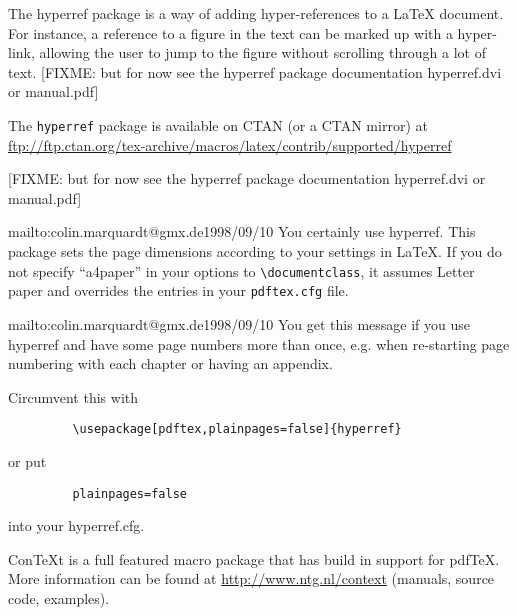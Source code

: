 \documentclass[11pt]{article}
\begin{document}
{ 

  The hyperref package is a way of adding hyper-references to a LaTeX
  document.  For instance, a reference to a figure in the text can be
  marked up with a hyper-link, allowing the user to jump to the figure
  without scrolling through a lot of text.  [FIXME: but for now see
  the hyperref package documentation hyperref.dvi or manual.pdf] }

The \texttt{hyperref} package is available on CTAN (or a CTAN mirror)
at
\url{ftp://ftp.ctan.org/tex-archive/macros/latex/contrib/supported/hyperref}



{ [FIXME: but for now
  see the hyperref package documentation hyperref.dvi or manual.pdf] }



{  {mailto:colin.marquardt@gmx.de}{1998/09/10}
  You certainly use hyperref. This package sets the page dimensions
  according to your settings in LaTeX. If you do not specify
  ``a4paper'' in your options to \verb+\documentclass+, it assumes
  Letter paper and overrides the entries in your \verb+pdftex.cfg+
  file.  }


{ {mailto:colin.marquardt@gmx.de}{1998/09/10}
  You get this message if you use hyperref and have some page numbers
  more than once, e.g. when re-starting page numbering with each
  chapter or having an appendix.

  Circumvent this with
\begin{verbatim}
         \usepackage[pdftex,plainpages=false]{hyperref}
\end{verbatim}
  or put
\begin{verbatim}
         plainpages=false
\end{verbatim}
  into your hyperref.cfg.  }




{ 

  ConTeXt is a full featured macro package that has build in support
  for pdfTeX. More information can be found at
  \url{http://www.ntg.nl/context} (manuals, source code, examples).  }



{ }

\printindex
\end{document}
